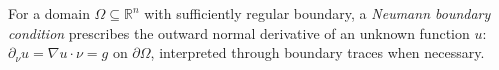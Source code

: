 
For a domain $\Omega\subseteq\mathbb R^n$ with sufficiently regular boundary, a \emph{Neumann boundary condition} prescribes the outward normal derivative of an unknown function $u$: $\partial_\nu u=\nabla u\cdot\nu=g$ on $\partial\Omega$, interpreted through boundary traces when necessary.

